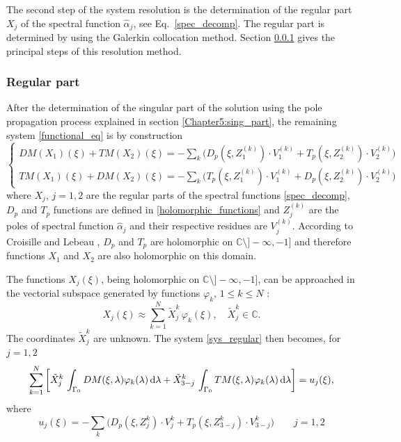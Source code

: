 The second step of the system resolution is the determination of the regular part $X_j$ of the spectral function $\hat{\alpha}_j$, see Eq.~\eqref{spec_decomp}. The regular part is determined by using the Galerkin collocation method. Section \ref{Chapter5:regular_part} gives the principal steps of this resolution method. 

\subsubsection{Regular part}
\label{Chapter5:regular_part}

After the determination of the singular part of the solution using the pole propagation process explained in section \ref{Chapter5:sing_part}, the remaining system \ref{functional_eq} is by construction
\begin{equation}
\label{sys_regular}
\begin{cases}
DM(X_1)(\xi) + TM(X_2)(\xi) = -\underset{k}{\sum} \Big( D_p(\xi,Z_1^{(k)})\cdot V_1^{(k)}+ T_p(\xi,Z_2^{(k)})\cdot V_2^{(k)}\Big)\\
TM(X_1)(\xi) + DM(X_2)(\xi)  =  -\underset{k}{\sum} \Big( T_p(\xi,Z_1^{(k)})\cdot V_1^{(k)}+ D_p(\xi,Z_2^{(k)})\cdot V_2^{(k)}\Big)
\end{cases}
\end{equation}
where $X_j$, $j=1,2$ are the regular parts of the spectral functions \eqref{spec_decomp}, $D_p$ and $T_p$ functions are defined in \eqref{holomorphic_functions} and $Z_j^{(k)}$ are the poles of spectral function $\hat{\alpha}_j$  and their respective residues are $V_j^{(k)}$. According to Croisille and Lebeau \cite{CroisilleLebeau}, $D_p$ and $T_p$ are holomorphic on $\mathbb{C}\setminus  ]-\infty,-1]$ and therefore functions $X_1$ and $X_2$ are also holomorphic on this domain.

The functions $X_j(\xi)$, being holomorphic on $\mathbb{C}\setminus  ]-\infty,-1]$, can be approached in the vectorial subspace generated by functions $\varphi_k, \, 1 \leq k \leq N$ :
\begin{equation}
\label{regular_part_decomp}
X_j(\xi) \approx \sum_{k=1}^N \tilde{X}_j^k \, \varphi_k(\xi), \quad \tilde{X}_j^k \in \mathbb{C}.
\end{equation}
The coordinates $\tilde{X}_j^k$ are unknown. The system \eqref{sys_regular} then becomes, for $j=1,2$
\begin{equation}
\label{sys_regular_gal}
\sum_{k=1}^N \left[ \tilde{X}_j^k \, \int_{\Gamma_0} DM(\xi,\lambda) \varphi_k(\lambda) \, {\rm d} \lambda + \tilde{X}_{3-j}^k \, \int_{\Gamma_0} TM(\xi,\lambda) \varphi_k(\lambda) \, {\rm d} \lambda \right] = u_j(\xi), 
\end{equation}
where
\begin{equation}
\label{second_member}
u_j(\xi) = -\sum_k \Big( D_p(\xi,Z_j^k)\cdot V_j^k+ T_p(\xi,Z_{3-j}^k)\cdot V_{3-j}^k\Big) \qquad j=1,2
\end{equation}

